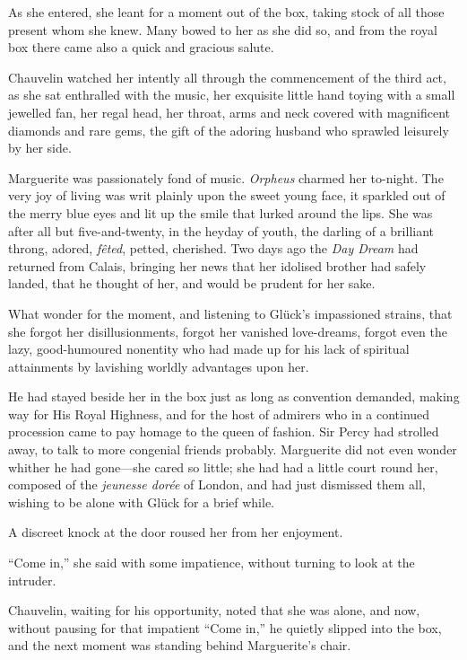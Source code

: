 \documentclass[paper=5.5in:8.5in,BCOR=7mm,twoside,DIV=calc,12pt,usegeometry,chapterprefix,endperiod,headings=big]{scrbook}
\begin{document}
As she entered, she leant for a moment out of the box, taking stock of all those present whom she knew. Many bowed to her as she did so, and from the royal box there came also a quick and gracious salute.

Chauvelin watched her intently all through the commencement of the third act, as she sat enthralled with the music, her exquisite little hand toying with a small jewelled fan, her regal head, her throat, arms and neck covered with magnificent diamonds and rare gems, the gift of the adoring husband who sprawled leisurely by her side.

Marguerite was passionately fond of music. \textit{Orpheus} charmed her to-night. The very joy of living was writ plainly upon the sweet young face, it sparkled out of the merry blue eyes and lit up the smile that lurked around the lips. She was after all but five-and-twenty, in the heyday of youth, the darling of a brilliant throng, adored, \textit{fêted}, petted, cherished. Two days ago the \textit{Day Dream} had returned from Calais, bringing her news that her idolised brother had safely landed, that he thought of her, and would be prudent for her sake.

What wonder for the moment, and listening to Glück's impassioned strains, that she forgot her disillusionments, forgot her vanished love-dreams, forgot even the lazy, good-humoured nonentity who had made up for his lack of spiritual attainments by lavishing worldly advantages upon her.

He had stayed beside her in the box just as long as convention demanded, making way for His Royal Highness, and for the host of admirers who in a continued procession came to pay homage to the queen of fashion. Sir Percy had strolled away, to talk to more congenial friends probably. Marguerite did not even wonder whither he had gone---she cared so little; she had had a little court round her, composed of the \textit{jeunesse dorée} of London, and had just dismissed them all, wishing to be alone with Glück for a brief while.

A discreet knock at the door roused her from her enjoyment.

\enquote{Come in,} she said with some impatience, without turning to look at the intruder.

Chauvelin, waiting for his opportunity, noted that she was alone, and now, without pausing for that impatient \enquote{Come in,} he quietly slipped into the box, and the next moment was standing behind Marguerite's chair.
\end{document}
